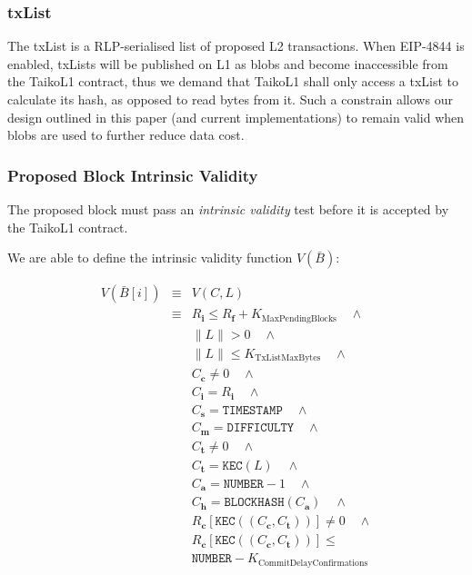 \documentclass[9pt,oneside]{amsart}
\begin{document}
\begin{multicols}{2}
\subsubsection{txList}\label{sec:txlist}
The txList is a RLP-serialised list of proposed L2 transactions. When EIP-4844 is enabled, txLists will be published on L1 as blobs and become inaccessible from the TaikoL1 contract, thus we demand that TaikoL1 shall only access a txList to calculate its hash, as opposed to read bytes from it. Such a constrain allows our design outlined in this paper (and current implementations) to remain valid when blobs are used to further reduce data cost.




\subsubsection{Proposed Block Intrinsic Validity}
The proposed block must pass an \textit{intrinsic validity} test before it is accepted by the TaikoL1 contract. 

We are able to define the intrinsic validity function $V(\bar{B})$:

\begin{eqnarray}
V(\bar{B}[i]) & \equiv &   V(C,L)  \\
\nonumber & \equiv &   R_\mathbf{i} \le R_\mathbf{f} + K_\mathrm{MaxPendingBlocks}   \quad \wedge \\
\nonumber& & \lVert L \rVert > 0 \quad \wedge \\
\nonumber & & \lVert L \rVert \le K_{\mathrm{TxListMaxBytes}} \quad \wedge \\
\nonumber& & C_{\mathbf{c}} \ne 0   \quad \wedge \\
\nonumber& & C_{\mathbf{i}} = R_\mathbf{i}   \quad \wedge \\
\nonumber& & C_{\mathbf{s}} = \texttt{TIMESTAMP}   \quad \wedge \\
\nonumber& & C_{\mathbf{m}} = \texttt{DIFFICULTY}   \quad \wedge \\
\nonumber& & C_{\mathbf{t}} \ne 0   \quad \wedge \\
\nonumber& & C_{\mathbf{t}} = \texttt{KEC}(L)   \quad \wedge \\
\nonumber& & C_{\mathbf{a}} = \texttt{NUMBER} - 1   \quad \wedge \\
\nonumber& & C_{\mathbf{h}} = \texttt{BLOCKHASH}(C_{\mathbf{a}})   \quad \wedge \\
\nonumber& & R_{\mathbf{c}}[\texttt{KEC}((C_{\mathbf{c}}, C_{\mathbf{t}}))] \ne 0  \quad \wedge \\
\nonumber& & R_{\mathbf{c}}[\texttt{KEC}((C_{\mathbf{c}}, C_{\mathbf{t}}))] \le  \\
\nonumber& &  \texttt{NUMBER}   -  K_{\mathrm{CommitDelayConfirmations}}
\end{eqnarray}


\end{multicols}
\end{document}
